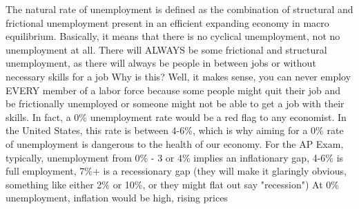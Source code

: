 \documentclass{scrreprt} %
\begin{document}
\begin{remark}

The natural rate of unemployment is defined as the combination of structural and frictional unemployment present in an efficient expanding economy in macro equilibrium.
Basically, it means that there is no cyclical unemployment, not no unemployment at all. There will ALWAYS be some frictional and structural unemployment, as there will always be people in between jobs or without necessary skills for a job
Why is this? Well, it makes sense, you can never employ EVERY member of a labor force because some people might quit their job and be frictionally unemployed or someone might not be able to get a job with their skills. In fact, a 0\% unemployment rate would be a red flag to any economist.
In the United States, this rate is between 4-6\%, which is why aiming for a 0\% rate of unemployment is dangerous to the health of our economy.
For the AP Exam, typically, unemployment from 0\% - 3 or 4\% implies an inflationary gap, 4-6\% is full employment, 7\%+ is a recessionary gap (they will make it glaringly obvious, something like either 2\% or 10\%, or they might flat out say "recession")
At 0\% unemployment, inflation would be high, rising prices

\end{remark}
\end{document}
